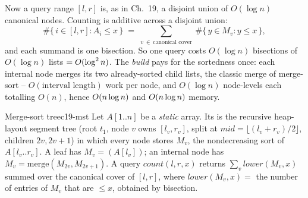 Now a query range \([l,r]\) is, as in Ch.~19, a disjoint union of \(O(\log n)\) canonical nodes.  Counting is additive across a disjoint union:
\[
  \#\{\,i\in[l,r]: A_i \le x\,\} \;=\; \sum_{v\ \in\ \text{canonical cover}} \ \#\{\,y\in M_v : y \le x\,\},
\]
and each summand is one bisection.  So one query costs \(O(\log n)\) bisections of \(O(\log n)\) lists \(=O(\log^2 n)\).  The \emph{build} pays for the sortedness once: each internal node merges its two already-sorted child lists, the classic merge of merge-sort -- \(O(\text{interval length})\) work per node, and \(O(\log n)\) node-levels each totalling \(O(n)\), hence \(O(n\log n)\) and \(O(n\log n)\) memory.

\begin{definition}{Merge-sort tree}{c19-mst}
Let \(A[1..n]\) be a \emph{static} array.  Its  is the recursive heap-layout segment tree (root \(t_1\), node \(v\) owns \([l_v,r_v]\), split at \(\mathit{mid}=\lfloor (l_v+r_v)/2\rfloor\), children \(2v,2v{+}1\)) in which every node stores \(M_v\), the nondecreasing sort of \(A[l_v..r_v]\).  A leaf has \(M_v=(A[l_v])\); an internal node has \(M_v = \mathrm{merge}(M_{2v}, M_{2v+1})\).  A  query \(\mathit{count}(l,r,x)\) returns \(\sum_{v}\mathit{lower}(M_v,x)\) summed over the canonical cover of \([l,r]\), where \(\mathit{lower}(M_v,x)=\) the number of entries of \(M_v\) that are \(\le x\), obtained by bisection.
\end{definition}


